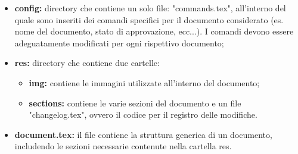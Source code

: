         \begin{itemize}
          \item \textbf{config:} directory che contiene un solo file: "commands.tex", all'interno del quale sono inseriti dei comandi specifici per il documento considerato (es. nome del documento, stato di approvazione, ecc...). I comandi devono essere adeguatamente modificati per ogni rispettivo documento;
          \item \textbf{res:} directory che contiene due cartelle:
            \begin{itemize}
              \item \textbf{img:} contiene le immagini utilizzate all'interno del documento;
              \item \textbf{sections:} contiene le varie sezioni del documento e un file "changelog.tex", ovvero il codice per il registro delle modifiche.
            \end{itemize}
          \item \textbf{document.tex:} il file contiene la struttura generica di un documento, includendo le sezioni necessarie contenute nella cartella res.
        \end{itemize}

